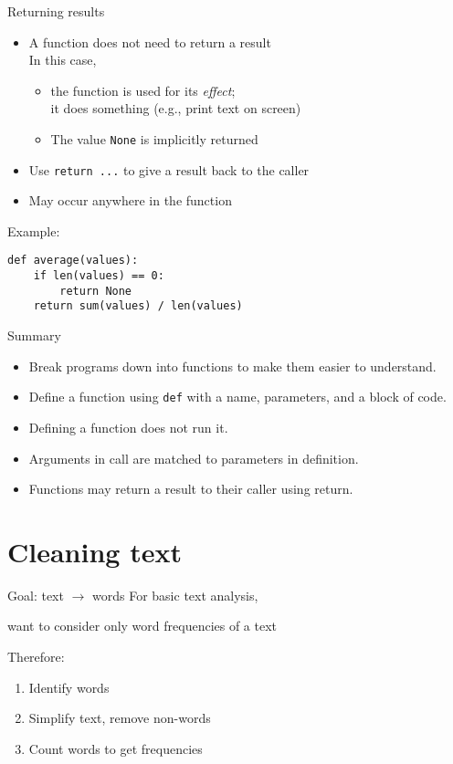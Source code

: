 \documentclass[aspectratio=169,usenames,dvipsnames]{beamer}
\begin{document}
\begin{frame}[fragile]{Returning results}
    \begin{itemize}
        \item A function does not need to return a result \\
            In this case, 
            \begin{itemize}
                \item the function is used for its \emph{effect};\\
                    it does something (e.g., print text on screen)
                \item The value \texttt{None} is implicitly returned
            \end{itemize}
        \item Use \texttt{return ...} to give a result back to the caller
        \item May occur anywhere in the function
    \end{itemize}

Example:
\begin{lstlisting}
def average(values):
    if len(values) == 0:
        return None
    return sum(values) / len(values)
\end{lstlisting}
\end{frame}

\begin{frame}{Summary}
    \begin{itemize}
        \item Break programs down into functions to make them easier
            to understand.
        \item Define a function using \texttt{def} with a name, parameters,
            and a block of code.
        \item Defining a function does not run it.
        \item Arguments in call are matched to parameters in definition.
        \item Functions may return a result to their caller using return.
    \end{itemize}
\end{frame}




\section{Cleaning text}
\frame{\tableofcontents[currentsection]}
\begin{frame}{Goal: text $\rightarrow$ words}
    For basic text analysis,

    want to consider only word frequencies of a text

    \pause
    Therefore:
    \begin{enumerate}
        \item Identify words
        \item Simplify text, remove non-words
        \item Count words to get frequencies
    \end{enumerate}
\end{frame}
\end{document}

